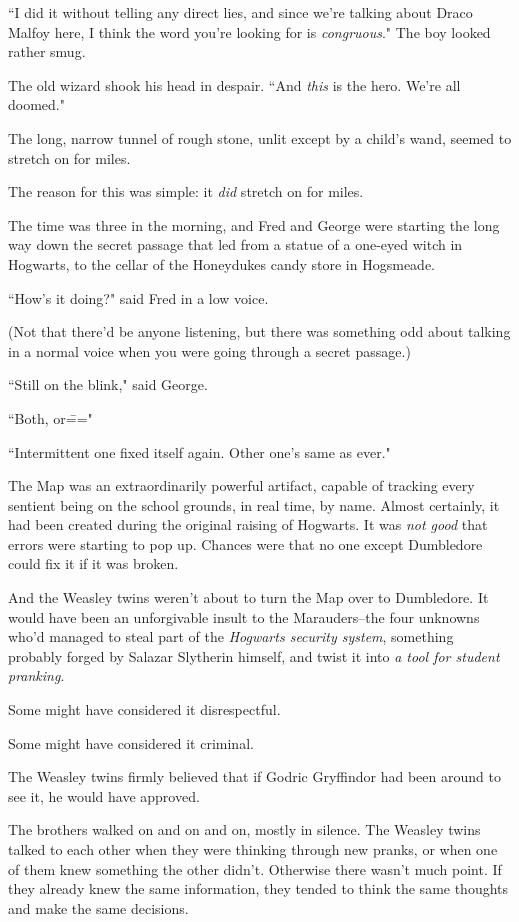 ``I did it without telling any direct lies, and since we're talking about Draco Malfoy here, I think the word you're looking for is \emph{congruous}." The boy looked rather smug.

The old wizard shook his head in despair. ``And \emph{this} is the hero. We're all doomed."


The long, narrow tunnel of rough stone, unlit except by a child's wand, seemed to stretch on for miles.

The reason for this was simple: it \emph{did} stretch on for miles.

The time was three in the morning, and Fred and George were starting the long way down the secret passage that led from a statue of a one-eyed witch in Hogwarts, to the cellar of the Honeydukes candy store in Hogsmeade.

``How's it doing?" said Fred in a low voice.

(Not that there'd be anyone listening, but there was something odd about talking in a normal voice when you were going through a secret passage.)

``Still on the blink," said George.

``Both, or\==="

``Intermittent one fixed itself again. Other one's same as ever."

The Map was an extraordinarily powerful artifact, capable of tracking every sentient being on the school grounds, in real time, by name. Almost certainly, it had been created during the original raising of Hogwarts. It was \emph{not good} that errors were starting to pop up. Chances were that no one except Dumbledore could fix it if it was broken.

And the Weasley twins weren't about to turn the Map over to Dumbledore. It would have been an unforgivable insult to the Marauders\---the four unknowns who'd managed to steal part of the \emph{Hogwarts security system}, something probably forged by Salazar Slytherin himself, and twist it into \emph{a tool for student pranking}.

Some might have considered it disrespectful.

Some might have considered it criminal.

The Weasley twins firmly believed that if Godric Gryffindor had been around to see it, he would have approved.

The brothers walked on and on and on, mostly in silence. The Weasley twins talked to each other when they were thinking through new pranks, or when one of them knew something the other didn't. Otherwise there wasn't much point. If they already knew the same information, they tended to think the same thoughts and make the same decisions.

